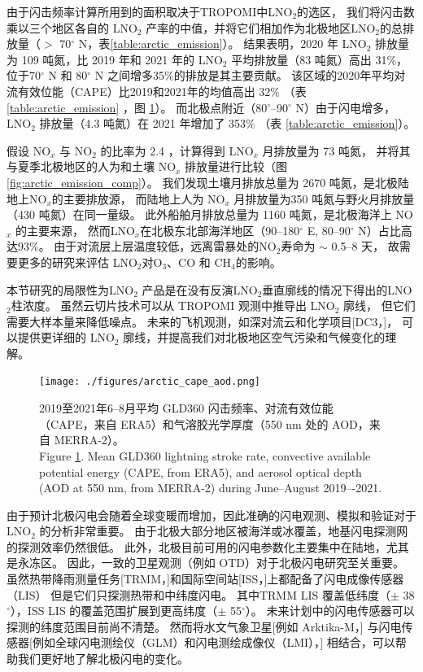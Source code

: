 由于闪击频率计算所用到的面积取决于TROPOMI中LNO$_2$的选区，
我们将闪击数乘以三个地区各自的 LNO$_2$ 产率的中值，并将它们相加作为北极地区LNO$_2$的总排放量（$>$ 70$^{\circ}$ N，表\ref{table:arctic_emission}）。
结果表明，2020 年 LNO$_2$ 排放量为 109 吨氮，比 2019 年和 2021 年的 LNO$_2$ 平均排放量（83 吨氮）高出 31\%，
位于70$^{\circ}$ N 和 80$^{\circ}$ N 之间增多35\%的排放是其主要贡献。
该区域的2020年平均对流有效位能（CAPE）比2019和2021年的均值高出 32\%
（表\ref{table:arctic_emission} ，图 \ref{fig:arctic_cape_aod}）。
而北极点附近（80$^{\circ}$--90$^{\circ}$ N）由于闪电增多，LNO$_2$ 排放量（4.3 吨氮）在 2021 年增加了 353\% （表 \ref{table:arctic_emission}）。

假设 NO$_x$ 与 NO$_2$ 的比率为 2.4 \citep{Silvern.2018}，计算得到 LNO$_x$ 月排放量为 73 吨氮，
并将其与夏季北极地区的人为和土壤 NO$_x$ 排放量进行比较（图\ref{fig:arctic_emission_comp}）。
我们发现土壤月排放总量为 2670 吨氮，是北极陆地上NO$_x$的主要排放源，
而陆地上人为 NO$_x$ 月排放量为350 吨氮与野火月排放量（430 吨氮）在同一量级。
此外船舶月排放总量为 1160 吨氮，是北极海洋上 NO$_x$ 的主要来源，
然而LNO$_x$在北极东北部海洋地区（90--180$^{\circ}$ E, 80--90$^{\circ}$ N）占比高达93\%。
由于对流层上层温度较低，远离雷暴处的NO$_2$寿命为 $\sim$ 0.5--8 天\citep{Schumann.2007,Nault.2017}，
故需要更多的研究来评估 LNO$_2$对O$_3$、CO 和 CH$_4$的影响。


本节研究的局限性为LNO$_2$ 产品是在没有反演LNO$_2$垂直廓线的情况下得出的LNO$_2$柱浓度。
虽然云切片技术\citep{BelmonteRivas.2015,Marais.2021}可以从 TROPOMI 观测中推导出 LNO$_2$ 廓线，
但它们需要大样本量来降低噪点。
未来的飞机观测，如深对流云和化学项目[DC3，\citet{Barth.2019}]，
可以提供更详细的 LNO$_2$ 廓线，并提高我们对北极地区空气污染和气候变化的理解\citep{Law.2007,Schmale.2018}。


\begin{figure}[H]
\centering
\texttt{[image: ./figures/arctic\_cape\_aod.png]}
\caption{
2019至2021年6--8月平均 GLD360 闪击频率、对流有效位能（CAPE，来自 ERA5）和气溶胶光学厚度（550 nm 处的 AOD，来自 MERRA-2）。\\
Figure \ref{fig:arctic_cape_aod}.
Mean GLD360 lightning stroke rate, convective available potential energy (CAPE, from ERA5), and aerosol optical depth (AOD at 550 nm, from MERRA-2) during June--August 2019–-2021.
}
\label{fig:arctic_cape_aod}
\end{figure}


由于预计北极闪电会随着全球变暖而增加，因此准确的闪电观测、模拟和验证对于 LNO$_2$ 的分析非常重要。
由于北极大部分地区被海洋或冰覆盖，地基闪电探测网的探测效率仍然很低\citep{Vagasky.2022}。
此外，北极目前可用的闪电参数化主要集中在陆地，尤其是永冻区\citep{Chen.2021a}。
因此，一致的卫星观测（例如 OTD）对于北极闪电研究至关重要。
虽然热带降雨测量任务[TRMM，\citet{Cecil.2014}]和国际空间站[ISS，\citet{Blakeslee.2020}]上都配备了闪电成像传感器（LIS）
但是它们只探测热带和中纬度闪电。
其中TRMM LIS 覆盖低纬度（$\pm$ 38$^{\circ}$），ISS LIS 的覆盖范围扩展到更高纬度（$\pm$ 55$^{\circ}$）。
未来计划中的闪电传感器可以探测的纬度范围目前尚不清楚。
然而将水文气象卫星[例如 Arktika-M，\citet{Asmus.2021}]
与闪电传感器[例如全球闪电测绘仪（GLM）和闪电测绘成像仪（LMI），\citet{Goodman.2013,Yang.2017}] 相结合，可以帮助我们更好地了解北极闪电的变化。


